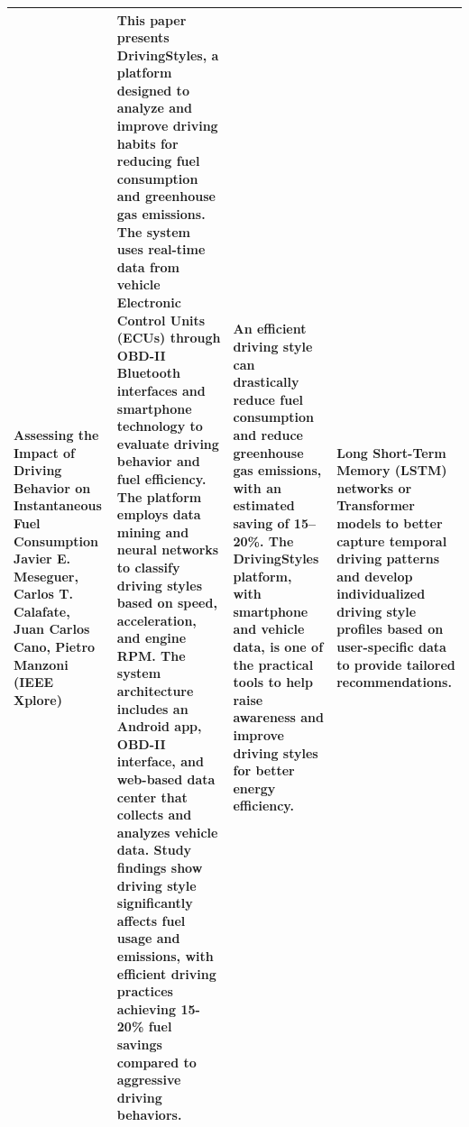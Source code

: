 \begin{longtable}{|p{}|p{}|p{}|p{}|}
Assessing the Impact of Driving Behavior on Instantaneous Fuel Consumption
\newline
Javier E. Meseguer, Carlos T. Calafate, Juan Carlos Cano, Pietro Manzoni
\newline
(IEEE Xplore) &
This paper presents DrivingStyles, a platform designed to analyze and improve driving habits for reducing fuel consumption and greenhouse gas emissions. The system uses real-time data from vehicle Electronic Control Units (ECUs) through OBD-II Bluetooth interfaces and smartphone technology to evaluate driving behavior and fuel efficiency.
\newline
The platform employs data mining and neural networks to classify driving styles based on speed, acceleration, and engine RPM. The system architecture includes an Android app, OBD-II interface, and web-based data center that collects and analyzes vehicle data. Study findings show driving style significantly affects fuel usage and emissions, with efficient driving practices achieving 15-20\% fuel savings compared to aggressive driving behaviors.
\newline
&
An efficient driving style can drastically reduce fuel consumption and reduce greenhouse gas emissions, with an estimated saving of 15--20\%. The DrivingStyles platform, with smartphone and vehicle data, is one of the practical tools to help raise awareness and improve driving styles for better energy efficiency. 
&
Long Short-Term Memory (LSTM) networks or Transformer models to better capture temporal driving patterns and develop individualized driving style profiles based on user-specific data to provide tailored recommendations. \\
\hline



\end{longtable}
